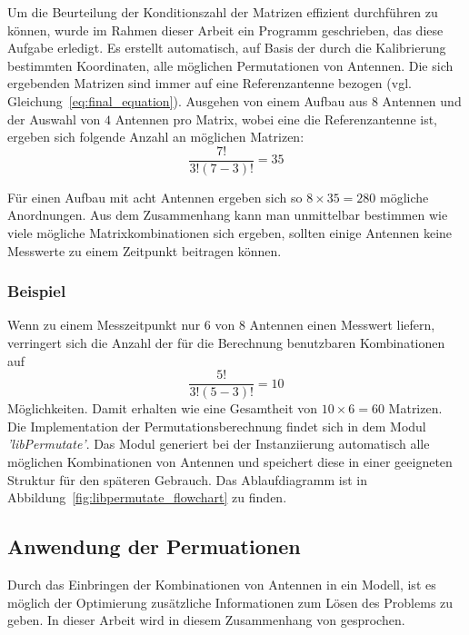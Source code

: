 %

%
Um die Beurteilung der Konditionszahl der Matrizen effizient durchführen zu können, wurde im Rahmen dieser Arbeit ein Programm geschrieben, das diese Aufgabe erledigt. Es erstellt automatisch, auf Basis der durch die Kalibrierung bestimmten Koordinaten, alle möglichen Permutationen von Antennen. Die sich ergebenden Matrizen sind immer auf eine Referenzantenne bezogen (vgl. Gleichung~\ref{eq:final_equation}). Ausgehen von einem Aufbau aus $8$ Antennen und der Auswahl von $4$ Antennen pro Matrix, wobei eine die Referenzantenne ist, ergeben sich folgende Anzahl an möglichen Matrizen:
% 
\begin{equation}
	\frac{7!}{3!(7-3)!}=35
% 
\end{equation}

%
Für einen Aufbau mit acht Antennen ergeben sich so $8\times 35 = 280$ mögliche Anordnungen. Aus dem Zusammenhang kann man unmittelbar bestimmen wie viele mögliche Matrixkombinationen sich ergeben, sollten einige Antennen keine Messwerte zu einem Zeitpunkt beitragen können.
%
\subsubsection{Beispiel}
%
Wenn zu einem Messzeitpunkt nur $6$ von $8$ Antennen einen Messwert liefern, verringert sich die Anzahl der für die Berechnung benutzbaren Kombinationen auf
%
\begin{equation}
	\frac{5!}{3!(5-3)!}=10 \nonumber
% 
\end{equation}
Möglichkeiten. Damit erhalten wie eine Gesamtheit von $10\times6=60$ Matrizen. \\
%

Die Implementation  der Permutationsberechnung findet sich in dem Modul \textit{'libPermutate'}. Das Modul generiert bei der Instanziierung automatisch alle möglichen Kombinationen von Antennen und speichert diese in einer geeigneten Struktur für den späteren Gebrauch. Das Ablaufdiagramm ist in Abbildung~\ref{fig:libpermutate_flowchart} zu finden.\\
%
\subsection{Anwendung der Permuationen}
\label{sec:Groupsize}
%
Durch das Einbringen der Kombinationen von Antennen in ein Modell, ist es möglich der Optimierung zusätzliche Informationen zum Lösen des Problems zu geben. In dieser Arbeit wird in diesem Zusammenhang von  gesprochen.


